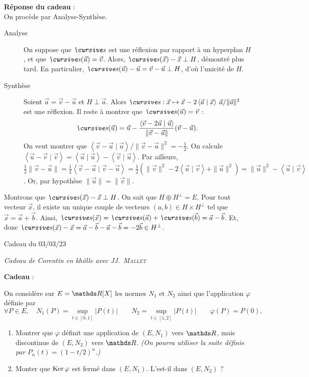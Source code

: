 \documentclass[a4paper]{article}
\begin{document}
	\bigskip\bigskip
	\textbf{Réponse du cadeau} :\\
	On procède par Analyse-Synthèse.
	\begin{description}
		\item[Analyse]  On suppose que $\s$ est une réflexion par rapport à un hyperplan $H$, et que $\s(\vec{u}) = \vec{v}$.
			Alors, $\s(\vec{x}) - \vec{x} \perp H$, démontré plus tard.
			En particulier, $\s(\vec{u}) - \vec{u} = \vec{v} - \vec{u} \perp H$, d'où l'unicité de $H$.
		\item[Synthèse] Soient $\vec{a} = \vec{v} - \vec{u}$ et $H \perp \vec{a}$.
			Alors $\s : \vec{x} \mapsto \vec{x} - 2 \left<\vec{a}  \mid \vec{x} \right>\: \vec{a} / \|\vec{a}\|^2$ est une réflexion.
			Il reste à montrer que $\s (\vec{u}) = \vec{v}$ : \[
				\s(\vec{u}) = \vec{u} - \frac{\left<\vec{v} -2 \vec{u}  \mid \vec{u} \right>}{\|\vec{v} - \vec{u}\|} (\vec{v} - \vec{u})
			.\] On veut montrer que $\left<\vec{v}-\vec{u}  \mid \vec{u} \right> / \|\vec{v} - \vec{u}\|^2 = -\frac{1}{2}$.
			On calcule $\left<\vec{u} - \vec{v}  \mid \vec{v} \right> = \left<\vec{u}  \mid \vec{u} \right> - \left<\vec{v}  \mid \vec{u} \right>$. Par ailleurs, $\frac{1}{2} \|\vec{v} - \vec{u}\| = \frac{1}{2} \left<\vec{v} - \vec{u}  \mid \vec{v}- \vec{u} \right> = \frac{1}{2}(\|\vec{v}\|^2 - 2 \left<\vec{u} \mid \vec{v} \right> + \|\vec{u}\|^2) = \|\vec{u}\|^2 - \left<\vec{u} \mid \vec{v} \right>$. Or, par hypothèse $\|\vec{u}\| = \|\vec{v}\|$.
	\end{description}
	Montrons que $\s(\vec{x}) - \vec{x} \perp H$.
	On sait que $H \oplus H^\perp = E$. Pour tout vecteur $\vec{x}$, il existe un unique couple de vecteurs $(a, b) \in H \times H^\perp$\/ tel que $\vec{x} = \vec{a} + \vec{b}$.
	Ainsi, $\s(\vec{x}) = \s(\vec{a}) + \s(\vec{b}) = \vec{a} - \vec{b}$.
	Et, donc $\s(\vec{x}) - \vec{x} = \vec{a} - \vec{b} - \vec{a}- \vec{b} =-2\vec{b} \in H^\perp$.

	\clearpage
	\centerline{\LARGE Cadeau du 03/03/23}
	\centerline{\textit{Cadeau de Corentin en khôlle avec \textsc{JJ.\ Mallet}}}

	\bigskip
	\bigskip
	\bigskip
	\textbf{Cadeau} :\\
	\begin{slshape}
		On considère sur $E = \R[X]$ les normes $N_1$ et $N_2$ ainsi que l'application $\varphi$ définie par \[
			\forall P \in E, \quad N_1(P) = \sup_{t \in [0,1]} |P(t)| \quad\quad N_2 = \sup_{t \in [1,2]} |P(t)| \quad\quad \varphi(P) = P(0)
		.\]
		\begin{enumerate}
			\item Montrer que $\varphi$ définit une application de $(E, N_1)$ vers $\R$, mais discontinue de $(E, N_2)$ vers $\R$. \textit{(On pourra utiliser la suite définie par $P_n(t) = (1 - t/2)^n$.)}
			\item Monter que $\operatorname{Ker} \varphi$ est fermé dans $(E, N_1)$. L'est-il dans $(E, N_2)$ ?
		\end{enumerate}
	\end{slshape}
\end{document}
